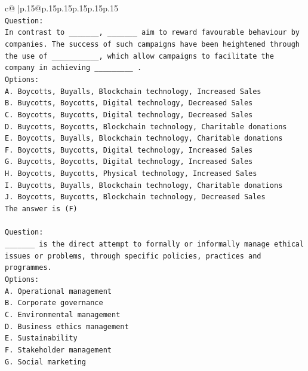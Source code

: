 \documentclass{article}
\begin{document}
{\begin{supertabular}{c@{$\;$}|p{.15\linewidth}@{}p{.15\linewidth}p{.15\linewidth}p{.15\linewidth}p{.15\linewidth}p{.15\linewidth}}
{{{\\ 
\texttt{Question:} \\
\texttt{In contrast to \_\_\_\_\_\_\_, \_\_\_\_\_\_\_ aim to reward favourable behaviour by companies. The success of such campaigns have been heightened through the use of \_\_\_\_\_\_\_\_\_\_\_, which allow campaigns to facilitate the company in achieving \_\_\_\_\_\_\_\_\_ .} \\
\texttt{Options:} \\
\texttt{A. Boycotts, Buyalls, Blockchain technology, Increased Sales} \\
\texttt{B. Buycotts, Boycotts, Digital technology, Decreased Sales} \\
\texttt{C. Boycotts, Buycotts, Digital technology, Decreased Sales} \\
\texttt{D. Buycotts, Boycotts, Blockchain technology, Charitable donations} \\
\texttt{E. Boycotts, Buyalls, Blockchain technology, Charitable donations} \\
\texttt{F. Boycotts, Buycotts, Digital technology, Increased Sales} \\
\texttt{G. Buycotts, Boycotts, Digital technology, Increased Sales} \\
\texttt{H. Boycotts, Buycotts, Physical technology, Increased Sales} \\
\texttt{I. Buycotts, Buyalls, Blockchain technology, Charitable donations} \\
\texttt{J. Boycotts, Buycotts, Blockchain technology, Decreased Sales} \\
\texttt{The answer is (F)} \\
\\ 
\texttt{Question:} \\
\texttt{\_\_\_\_\_\_\_ is the direct attempt to formally or informally manage ethical issues or problems, through specific policies, practices and programmes.} \\
\texttt{Options:} \\
\texttt{A. Operational management} \\
\texttt{B. Corporate governance} \\
\texttt{C. Environmental management} \\
\texttt{D. Business ethics management} \\
\texttt{E. Sustainability} \\
\texttt{F. Stakeholder management} \\
\texttt{G. Social marketing} \\
}}}
\end{supertabular}}
\end{document}
